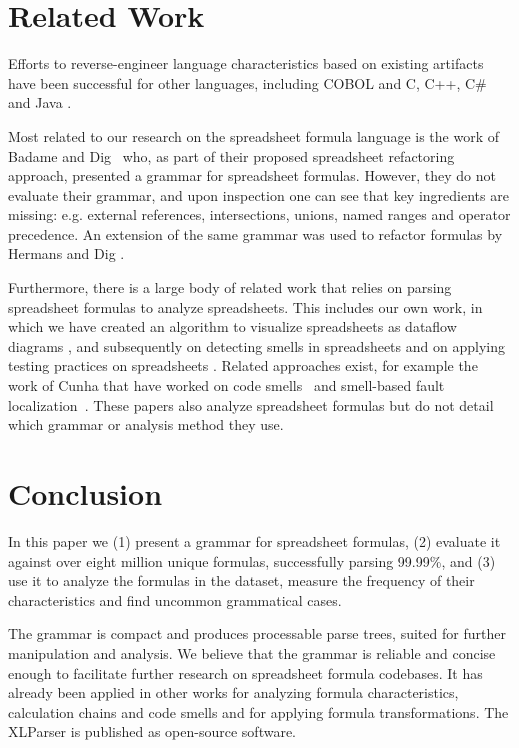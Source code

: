 \documentclass[times]{smrauth}
\begin{document}
\section{Related Work}
\label{section:relatedWork}
Efforts to reverse-engineer language characteristics based on existing artifacts have been successful for other languages, including COBOL \cite{van1997obtaining} and C, C++, C\# and Java \cite{zaytsev2010recovery}.

Most related to our research on the spreadsheet formula language is the work of Badame and Dig~\cite{badame2012refactoring} who, as part of their proposed spreadsheet refactoring approach, presented a grammar for spreadsheet formulas. However, they do not evaluate their grammar, and upon inspection one can see that key ingredients are missing: e.g. external references, intersections, unions, named ranges and operator precedence. An extension of the same grammar was used to refactor formulas by Hermans and Dig \cite{hermans2014bumblebee}.

Furthermore, there is a large body of related work that relies on parsing spreadsheet formulas to analyze spreadsheets. This includes our own work, in which we have created an algorithm to visualize spreadsheets as dataflow diagrams \cite{DBLP:conf/icse/HermansPD11}, and subsequently on detecting smells in spreadsheets \cite{DBLP:conf/icse/HermansPD12,DBLP:conf/icsm/Hermans212} and on applying testing practices on spreadsheets \cite{Expector}. Related approaches exist, for example the work of Cunha that have worked on code smells~\cite{iccsa12} and smell-based fault localization~\cite{conf/icsme/CunhaFMPS14}. These papers also analyze spreadsheet formulas but do not detail which grammar or analysis method they use.

\section{Conclusion}
\label{section:conclusion}
In this paper we (1) present a grammar for spreadsheet formulas, (2) evaluate it against over eight million unique formulas, successfully parsing 99.99\%, and (3) use it to analyze the formulas in the dataset, measure the frequency of their characteristics and find uncommon grammatical cases.

The grammar is compact and produces processable parse trees, suited for further manipulation and analysis. We believe that the grammar is reliable and concise enough to facilitate further research on spreadsheet formula codebases. It has already been applied in other works for analyzing formula characteristics, calculation chains and code smells and for applying formula transformations. The XLParser is published as open-source software.
\end{document}

